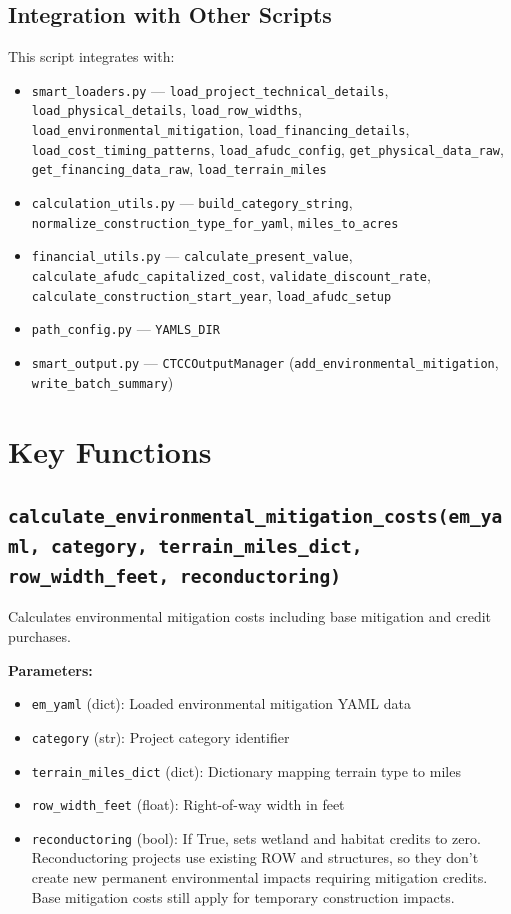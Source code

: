 \documentclass[ctcc_full_documentation.tex]{subfiles}
\begin{document}
\subsection{Integration with Other Scripts}

This script integrates with:
\begin{itemize}
    \item \texttt{smart\_loaders.py} --- \texttt{load\_project\_technical\_details}, \texttt{load\_physical\_details}, \texttt{load\_row\_widths}, \texttt{load\_environmental\_mitigation}, \texttt{load\_financing\_details}, \texttt{load\_cost\_timing\_patterns}, \texttt{load\_afudc\_config}, \texttt{get\_physical\_data\_raw}, \texttt{get\_financing\_data\_raw}, \texttt{load\_terrain\_miles}
    \item \texttt{calculation\_utils.py} --- \texttt{build\_category\_string}, \texttt{normalize\_construction\_type\_for\_yaml}, \texttt{miles\_to\_acres}
    \item \texttt{financial\_utils.py} --- \texttt{calculate\_present\_value}, \texttt{calculate\_afudc\_capitalized\_cost}, \texttt{validate\_discount\_rate}, \texttt{calculate\_construction\_start\_year}, \texttt{load\_afudc\_setup}
    \item \texttt{path\_config.py} --- \texttt{YAMLS\_DIR}
    \item \texttt{smart\_output.py} --- \texttt{CTCCOutputManager} (\texttt{add\_environmental\_mitigation}, \texttt{write\_batch\_summary})
\end{itemize}

\section{Key Functions}

\subsection{\texttt{calculate\_environmental\_mitigation\_costs(em\_yaml, category, terrain\_miles\_dict, row\_width\_feet, reconductoring)}}

Calculates environmental mitigation costs including base mitigation and credit purchases.

\textbf{Parameters:}
\begin{itemize}
    \item \texttt{em\_yaml} (dict): Loaded environmental mitigation YAML data
    \item \texttt{category} (str): Project category identifier
    \item \texttt{terrain\_miles\_dict} (dict): Dictionary mapping terrain type to miles
    \item \texttt{row\_width\_feet} (float): Right-of-way width in feet
    \item \texttt{reconductoring} (bool): If True, sets wetland and habitat credits to zero. Reconductoring projects use existing ROW and structures, so they don't create new permanent environmental impacts requiring mitigation credits. Base mitigation costs still apply for temporary construction impacts.
\end{itemize}
\end{document}
